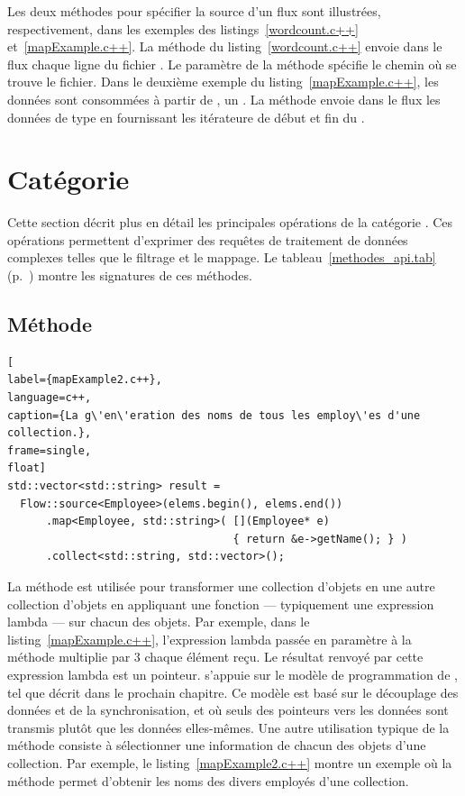 Les deux m\'ethodes pour sp\'ecifier la source d'un flux sont illustr\'ees, respectivement, dans les exemples des listings~\ref{wordcount.c++} et~\ref{mapExample.c++}. La m\'ethode  du listing~\ref{wordcount.c++} envoie dans le flux chaque ligne du fichier . Le param\`etre  de la m\'ethode sp\'ecifie le chemin o\`u se trouve le fichier. Dans le deuxième exemple du listing~\ref{mapExample.c++}, les donn\'ees sont consomm\'ees \`a partir de , un . La m\'ethode  envoie dans le flux les donn\'ees de type  en fournissant les it\'erateure de d\'ebut et fin du .


\section{Cat\'egorie }

\label{transformation.sect}

Cette section d\'ecrit plus en d\'etail les principales op\'erations de la cat\'egorie . Ces op\'erations permettent d'exprimer des requ\^etes de traitement de donn\'ees complexes telles que le filtrage et le mappage. Le tableau~\ref{methodes_api.tab} (p.~\pageref{transformation.page}) montre les signatures de ces méthodes. 


\subsection{M\'ethode }




\begin{lstlisting}[
label={mapExample2.c++},
language=c++,
caption={La g\'en\'eration des noms de tous les employ\'es d'une collection.},
frame=single,
float]
std::vector<std::string> result =
  Flow::source<Employee>(elems.begin(), elems.end())
      .map<Employee, std::string>( [](Employee* e) 
                                   { return &e->getName(); } )
      .collect<std::string, std::vector>();
\end{lstlisting}


La m\'ethode  est utilis\'ee pour transformer une collection d'objets en une autre collection d'objets en appliquant une fonction --- typiquement une expression lambda --- sur chacun des objets. Par exemple, dans le listing~\ref{mapExample.c++}, l'expression lambda pass\'ee en param\`etre \`a la m\'ethode  multiplie par 3 chaque \'el\'ement re\c{c}u. Le r\'esultat renvoy\'e par cette expression lambda est un pointeur. \PpFf{} s'appuie sur le mod\`ele de programmation de , tel que d\'ecrit dans le prochain chapitre. Ce mod\`ele est bas\'e sur le d\'ecouplage des donn\'ees et de la synchronisation, et o\`u seuls des pointeurs vers les donn\'ees sont transmis plut\^ot que les donn\'ees elles-m\^emes.
%
Une autre utilisation typique de la méthode  consiste \`a s\'electionner une information de chacun des objets d'une collection. Par exemple, le listing~\ref{mapExample2.c++} montre un exemple o\`u la méthode  permet d'obtenir les noms des divers employ\'es d'une collection. 


